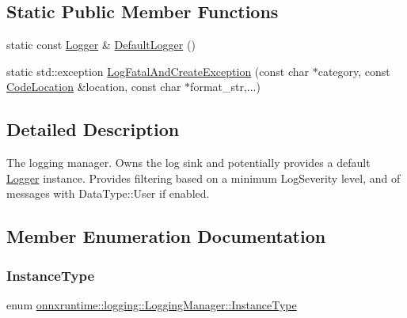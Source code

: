 \subsection*{Static Public Member Functions}
\begin{DoxyCompactItemize}
\item 
static const \mbox{\hyperlink{classonnxruntime_1_1logging_1_1Logger}{Logger}} \& \mbox{\hyperlink{classonnxruntime_1_1logging_1_1LoggingManager_a8b2e364282876c313a953e4f81647cc2}{Default\+Logger}} ()
\item 
static std\+::exception \mbox{\hyperlink{classonnxruntime_1_1logging_1_1LoggingManager_ae0a7438714587b804d34dbc656911216}{Log\+Fatal\+And\+Create\+Exception}} (const char $\ast$category, const \mbox{\hyperlink{structonnxruntime_1_1CodeLocation}{Code\+Location}} \&location, const char $\ast$format\+\_\+str,...)
\end{DoxyCompactItemize}


\subsection{Detailed Description}
The logging manager. Owns the log sink and potentially provides a default \mbox{\hyperlink{classonnxruntime_1_1logging_1_1Logger}{Logger}} instance. Provides filtering based on a minimum Log\+Severity level, and of messages with Data\+Type\+::\+User if enabled. 



\subsection{Member Enumeration Documentation}
\mbox{\label{classonnxruntime_1_1logging_1_1LoggingManager_af3489102aaa98cc9b30fcd5ac641eef6}} 
\subsubsection{\texorpdfstring{Instance\+Type}{InstanceType}}
{\footnotesize\ttfamily enum \mbox{\hyperlink{classonnxruntime_1_1logging_1_1LoggingManager_af3489102aaa98cc9b30fcd5ac641eef6}{onnxruntime\+::logging\+::\+Logging\+Manager\+::\+Instance\+Type}}}

